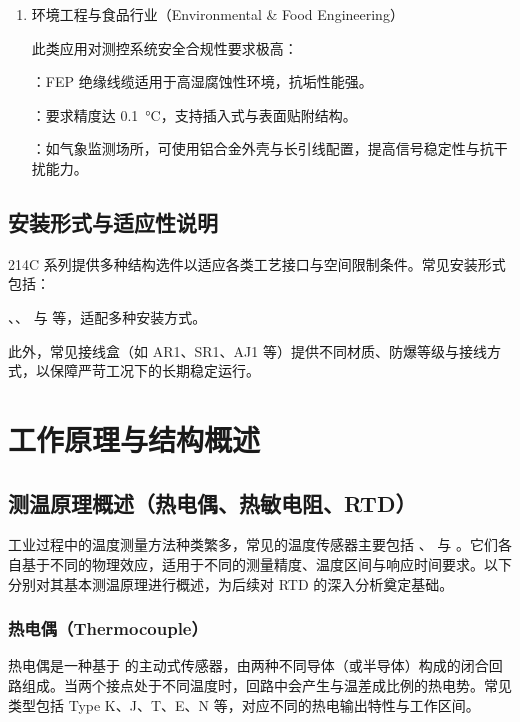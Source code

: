 \begin{enumerate}
	：快速热变中需选响应快、分辨率高的 RT 元件。
	
	\item 环境工程与食品行业（Environmental \& Food Engineering）
	
	此类应用对测控系统安全合规性要求极高：
	
	：FEP 绝缘线缆适用于高湿腐蚀性环境，抗垢性能强。
	
	：要求精度达 \SI{0.1}{\degreeCelsius}，支持插入式与表面贴附结构。
	
	：如气象监测场所，可使用铝合金外壳与长引线配置，提高信号稳定性与抗干扰能力。
\end{enumerate}

\subsection{安装形式与适应性说明}

214C 系列提供多种结构选件以适应各类工艺接口与空间限制条件。常见安装形式包括：

、、 与  等，适配多种安装方式。

此外，常见接线盒（如 AR1、SR1、AJ1 等）提供不同材质、防爆等级与接线方式，以保障严苛工况下的长期稳定运行。

\section{工作原理与结构概述}

\subsection{测温原理概述（热电偶、热敏电阻、RTD）}

工业过程中的温度测量方法种类繁多，常见的温度传感器主要包括 、 与 。它们各自基于不同的物理效应，适用于不同的测量精度、温度区间与响应时间要求。以下分别对其基本测温原理进行概述，为后续对 RTD 的深入分析奠定基础。

\subsubsection{热电偶（Thermocouple）}

热电偶是一种基于  的主动式传感器，由两种不同导体（或半导体）构成的闭合回路组成。当两个接点处于不同温度时，回路中会产生与温差成比例的热电势。常见类型包括 Type K、J、T、E、N 等，对应不同的热电输出特性与工作区间。

